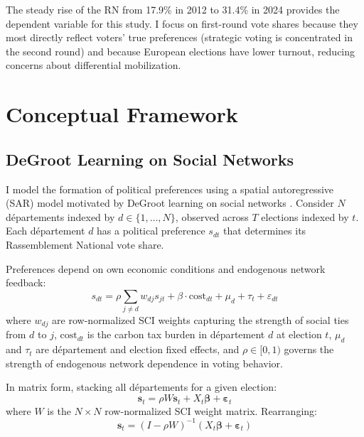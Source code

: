 \documentclass[12pt]{article}
\newcommand{\rn}{Rassemblement National}
\newcommand{\dept}{d\'{e}partement}
\newcommand{\depts}{d\'{e}partements}
\begin{document}
The steady rise of the RN from 17.9\% in 2012 to 31.4\% in 2024 provides the dependent variable for this study. I focus on first-round vote shares because they most directly reflect voters' true preferences (strategic voting is concentrated in the second round) and because European elections have lower turnout, reducing concerns about differential mobilization.



\section{Conceptual Framework}
\label{sec:framework}

\subsection{DeGroot Learning on Social Networks}

I model the formation of political preferences using a spatial autoregressive (SAR) model motivated by DeGroot learning on social networks \citep{degroot1974reaching, golub2010naive}. Consider $N$ \depts{} indexed by $d \in \{1, \ldots, N\}$, observed across $T$ elections indexed by $t$. Each \dept{} $d$ has a political preference $s_{dt}$ that determines its \rn{} vote share.

Preferences depend on own economic conditions and endogenous network feedback:
\begin{equation}
s_{dt} = \rho \sum_{j \neq d} w_{dj} s_{jt} + \beta \cdot \text{cost}_{dt} + \mu_d + \tau_t + \varepsilon_{dt}
\label{eq:degroot}
\end{equation}
where $w_{dj}$ are row-normalized SCI weights capturing the strength of social ties from $d$ to $j$, $\text{cost}_{dt}$ is the carbon tax burden in \dept{} $d$ at election $t$, $\mu_d$ and $\tau_t$ are \dept{} and election fixed effects, and $\rho \in [0, 1)$ governs the strength of endogenous network dependence in voting behavior.

In matrix form, stacking all \depts{} for a given election:
\begin{equation}
\mathbf{s}_t = \rho W \mathbf{s}_t + X_t \boldsymbol{\beta} + \boldsymbol{\varepsilon}_t
\label{eq:sar_matrix}
\end{equation}
where $W$ is the $N \times N$ row-normalized SCI weight matrix. Rearranging:
\begin{equation}
\mathbf{s}_t = (I - \rho W)^{-1} (X_t \boldsymbol{\beta} + \boldsymbol{\varepsilon}_t)
\label{eq:sar_solution}
\end{equation}
\end{document}
